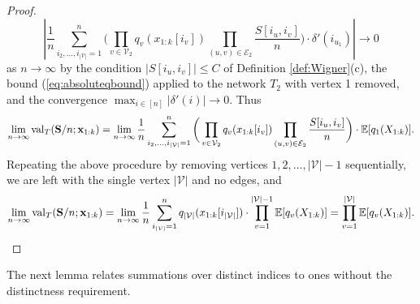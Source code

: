 \documentclass[10pt,reqno]{amsart}
\def\cV{\mathcal{V}}
\def\val{\operatorname{val}}
\def\bbE{{\mathbb{E}}}
\def\bx{\mathbf{x}}
\def\calE{\mathcal{E}}
\def\calV{\mathcal{V}}
\begin{document}
\begin{proof}
\[\left|\frac{1}{n}\sum_{i_2, \ldots, i_{|\cV|} = 1}^n 
\bigg( \prod_{v \in \calV_2} q_v(x_{1:k}[i_v]) \prod_{(u,v) \in \calE_2} \frac{S[i_u,i_v]}{n}  \bigg) 
\cdot \delta'(i_{u_1})\right| \to 0\]
as $n \to \infty$
by the condition $|S[i_u,i_v]| \leq C$ of Definition \ref{def:Wigner}(c),
the bound (\ref{eq:absoluteqbound}) applied to the network $T_2$ with vertex 1
removed, and the convergence $\max_{i \in [n]} |\delta'(i)| \to 0$. Thus
\[\lim_{n \to \infty}
\val_{T}(\bS/n; \bx_{1:k})=
\lim_{n \to \infty} \frac{1}{n}\sum_{i_2, \ldots, i_{|\cV|} = 1}^n 
\bigg( \prod_{v \in \calV_2} q_v(x_{1:k}[i_v]) \prod_{(u,v) \in \calE_2}
\frac{S[i_u,i_v]}{n}  \bigg) \cdot \bbE[q_1(X_{1:k})].\]
Repeating the above procedure by removing vertices $1,2,\ldots,|\cV|-1$
sequentially, we are left with the single vertex $|\cV|$ and no edges, and
\[\lim_{n \to \infty} \val_{T}(\bS/n; \bx_{1:k})
=\lim_{n \to\infty} \frac{1}{n}\sum_{i_{|\cV|}=1}^n q_{|\cV|}(x_{1:k}[i_{|\cV|}])
\cdot \prod_{v=1}^{|\cV|-1} \bbE[q_v(X_{1:k})]
=\prod_{v=1}^{|\cV|} \bbE[q_v(X_{1:k})].\]
\end{proof}

The next lemma relates summations over distinct indices to ones without
the distinctness requirement.
\end{document}
